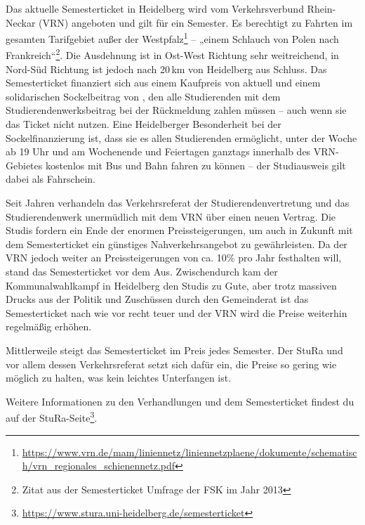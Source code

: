 Das aktuelle Semesterticket in Heidelberg wird vom Verkehrsverbund Rhein-Neckar (VRN) angeboten und gilt für ein Semester. Es berechtigt zu Fahrten im gesamten Tarifgebiet außer der Westpfalz\footnote{\url{https://www.vrn.de/mam/liniennetz/liniennetzplaene/dokumente/schematisch/vrn_regionales_schienennetz.pdf}} -- „einem Schlauch von Polen nach Frankreich“\footnote{Zitat aus der Semesterticket Umfrage der FSK im Jahr 2013}. Die Ausdehnung ist in Ost-West Richtung sehr weitreichend, in Nord-Süd Richtung ist jedoch nach 20\,km von Heidelberg aus Schluss. Das Semesterticket finanziert sich aus einem Kaufpreis von aktuell \EUR{\semesterticket} und einem solidarischen Sockelbeitrag von \EUR{\sockelbeitrag}, den alle Studierenden mit dem Studierendenwerksbeitrag bei der Rückmeldung zahlen müssen -- auch wenn sie das Ticket nicht nutzen. Eine Heidelberger Besonderheit bei der Sockelfinanzierung ist, dass sie es allen Studierenden ermöglicht, unter der Woche ab 19 Uhr und am Wochenende und Feiertagen ganztags innerhalb des VRN-Gebietes kostenlos mit Bus und Bahn fahren zu können -- der Studiausweis gilt dabei als Fahrschein.

Seit Jahren verhandeln das Verkehrsreferat der Studierendenvertretung und das Studierendenwerk unermüdlich mit dem VRN über einen neuen Vertrag. Die Studis fordern ein Ende der enormen Preissteigerungen, um auch in Zukunft mit dem Semesterticket ein günstiges Nahverkehrsangebot zu gewährleisten. Da der VRN jedoch weiter an Preissteigerungen von ca. 10\% pro Jahr festhalten will, stand das Semesterticket vor dem Aus. Zwischendurch kam der Kommunalwahlkampf in Heidelberg den Studis zu Gute, aber trotz massiven Drucks aus der Politik und Zuschüssen durch den Gemeinderat ist das Semesterticket nach wie vor recht teuer und der VRN wird die Preise weiterhin regelmäßig erhöhen.

Mittlerweile steigt das Semesterticket im Preis jedes Semester. Der StuRa und vor allem dessen Verkehrsreferat setzt sich dafür ein, die Preise so gering wie möglich zu halten, was kein leichtes Unterfangen ist.

Weitere Informationen zu den Verhandlungen und dem Semesterticket findest du auf der StuRa-Seite\footnote{\url{https://www.stura.uni-heidelberg.de/semesterticket}}.
